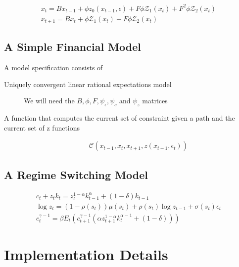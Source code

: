 \documentclass[12pt]{article}
\begin{document}
\begin{gather}
  \label{eq:1}
  x_t=B x_{t-1} + \phi z_0(x_{t-1},\epsilon) + F \phi \mathcal{Z}_1(x_t)+  F^2 \phi \mathcal{Z}_2(x_t)\\
  x_{t+1}=B x_{t} + \phi \mathcal{Z}_1(x_t) + F \phi \mathcal{Z}_2(x_t)
\end{gather}




\subsection{A Simple Financial Model}
\label{sec:simple-financ-model}

A model specification consists of
\begin{description}
\item[Uniquely convergent linear rational expectations model] 
We will need the $B, \phi, F, \psi_\epsilon, \psi_c \text{ and }\psi_z$ matrices
\item[A function that computes the current set of constraint given a path and the current set of z functions] 
  \begin{gather*}
    \mathcal{C}(x_{t-1},x_{t},x_{t+1},z(x_{t-1},\epsilon_t))
  \end{gather*}
\end{description}
\subsection{A Regime Switching Model}
\label{sec:regime-switch-model}



\cite{foerster13}

\begin{gather*}
c_t + z_t k_t = z_t^{1-\alpha} k_{t-1}^\alpha + (1-\delta)k_{t-1}\\
 \log z_t = (1-\rho(s_t))\mu(s_t) + \rho(s_t)\log z_{t-1}+ \sigma(s_t) \epsilon_t\\
 c_t^{\gamma-1} = \beta  
 E_t ( c_{t+1}^{\gamma-1} (\alpha z_{t+1}^{1-\alpha} k_t^{\alpha -1} + (1-\delta) ))
\end{gather*}



\section{Implementation Details }
\label{sec:implementation}
\end{document}
